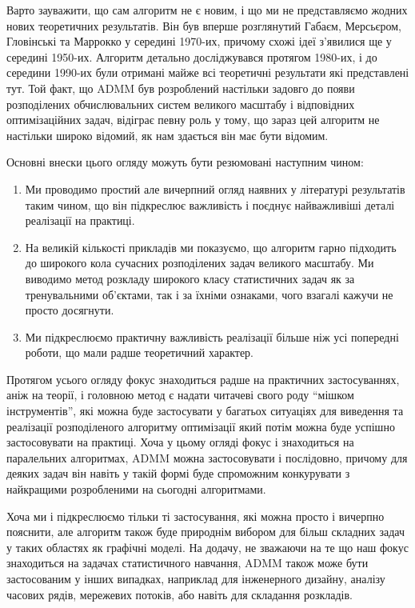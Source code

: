 Варто зауважити, що сам алгоритм не є новим, і що ми не представляємо жодних нових теоретичних результатів. Він був вперше розглянутий Габаєм, Мерсьєром, Гловінські та Маррокко у середині 1970-их, причому схожі ідеї з'явилися ще у середині 1950-их. Алгоритм детально досліджувався протягом 1980-их, і до середини 1990-их були отримані майже всі теоретичні результати які представлені тут. Той факт, що ADMM був розроблений настільки задовго до появи розподілених обчислювальних систем великого масштабу і відповідних оптимізаційних задач, відіграє певну роль у тому, що зараз цей алгоритм не настільки широко відомий, як нам здається він має бути відомим. \medskip

Основні внески цього огляду можуть бути резюмовані наступним чином: 
\begin{enumerate}
	\item Ми проводимо простий але вичерпний огляд наявних у літературі результатів таким чином, що він підкреслює важливість і поєднує найважливіші деталі реалізації на практиці.
	\item На великій кількості прикладів ми показуємо, що алгоритм гарно підходить до широкого кола сучасних розподілених задач великого масштабу. Ми виводимо метод розкладу широкого класу статистичних задач як за тренувальними об'єкт\-ами, так і за їхніми ознаками, чого взагалі кажучи не просто досягнути.
	\item Ми підкреслюємо практичну важливість реалізації більше \allowbreak ніж усі попередні роботи, що мали радше теоретичний характер. 
\end{enumerate}

Протягом усього огляду фокус знаходиться радше на практичних застосуваннях, аніж на теорії, і головною метод є надати читачеві свого роду ``мішком інструментів'', які можна буде застосувати у багатьох ситуаціях для виведення та реалізації розподіленого алгоритму оптимізації який потім можна буде успішно застосовувати на практиці. Хоча у цьому огляді фокус і знаходиться на паралельних алгоритмах, ADMM можна застосовувати і послідовно, причому для деяких задач він навіть у такій формі буде спроможним конкурувати з найкращими розробленими на сьогодні алгоритмами. \medskip

Хоча ми і підкреслюємо тільки ті застосування, які можна просто і вичерпно пояснити, але алгоритм також буде природнім вибором для більш складних задач у таких областях як графічні моделі. На додачу, не зважаючи на те що наш фокус знаходиться на задачах статистичного навчання, ADMM також може бути застосованим у інших випадках, наприклад для інженерного дизайну, аналізу часових рядів, мережевих потоків, або навіть для складання розкладів.


